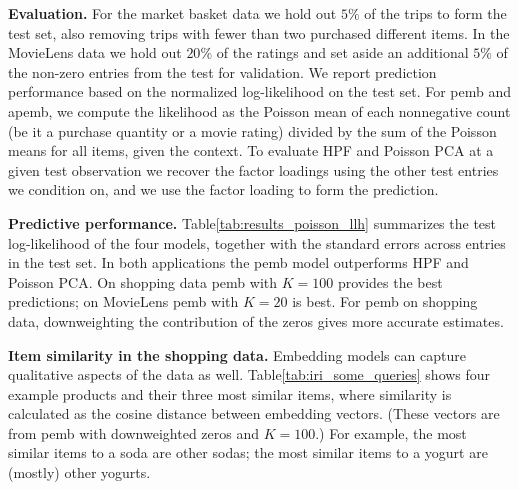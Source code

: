 \documentclass[12pt]{article}
\DeclareRobustCommand{\parhead}[1]{\vspace{0.05in} \textbf{#1} }
\begin{document}
\parhead{Evaluation.} For the market basket data we hold out $5\%$ of
the trips to form the test set, also removing trips with fewer than
two purchased different items. In the MovieLens data we hold out
$20\%$ of the ratings and set aside an additional $5\%$ of the
non-zero entries from the test for validation.  We report prediction
performance based on the normalized log-likelihood on the test
set. For \gls{pemb} and \gls{apemb}, we compute the likelihood as the
Poisson mean of each nonnegative count (be it a purchase quantity or a
movie rating) divided by the sum of the Poisson means for all items,
given the context. To evaluate \gls{HPF} and Poisson \gls{PCA} at a
given test observation we recover the factor loadings using the other
test entries we condition on, and we use the factor loading to form
the prediction.

\parhead{Predictive performance.}
Table\nobreakspace \ref {tab:results_poisson_llh} summarizes the test log-likelihood of
the four models, together with the standard errors across entries in
the test set. In both applications the \gls{pemb} model outperforms
\gls{HPF} and Poisson \gls{PCA}. On shopping data \gls{pemb} with
$K=100$ provides the best predictions; on MovieLens \gls{pemb} with
$K=20$ is best. For \gls{pemb} on shopping data, downweighting the
contribution of the zeros gives more accurate estimates.

\parhead{Item similarity in the shopping data.} Embedding models can
capture qualitative aspects of the data as well.
Table\nobreakspace \ref {tab:iri_some_queries} shows four example products and their three
most similar items, where similarity is calculated as the cosine
distance between embedding vectors. (These vectors are from \gls{pemb}
with downweighted zeros and $K=100$.) For example, the most similar items to a soda are
other sodas; the most similar items to a yogurt are (mostly) other
yogurts.
\end{document}
